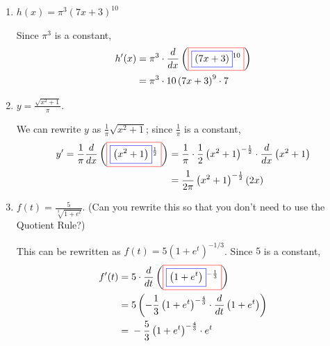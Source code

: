 \documentclass{article}
\begin{document}
\begin{enumerate}
\begin{enumerate}
  \item
    \begin{problem}[\vfill\newpage]
      $h(x) = \pi^3 (7x + 3)^{10}$
    \end{problem}

    \begin{solution}
      Since $\pi^3$ is a constant,
      \begin{align*}
        h'(x) = {} & \pi ^3\cdot \frac{d}{dx} \left(\fcolorbox{red}{white}{$\displaystyle \fcolorbox{blue}{white}{$\displaystyle  \left(7 x+ 3\right)$}^ { 10} $}\right) \\
        = {} & \pi ^3\cdot 10 \left(7 x+ 3\right)^ { 9} \cdot 7
      \end{align*}
    \end{solution}

  \item
    \begin{problem}[\stretch{0.5}]
      $y = \displaystyle \frac{\sqrt{x^2 + 1}}{\pi}$.
    \end{problem}

    \begin{solution}
      We can rewrite $y$ as $\frac{1}{\pi} \sqrt{x^2 + 1}$; since
      $\frac{1}{\pi}$ is a constant,
      \begin{align*}
        y' = {} \frac{1}{\pi} \frac{d}{dx}
        \left(\fcolorbox{red}{white}{$\displaystyle
            \fcolorbox{blue}{white}{$\displaystyle  \left(x^2 + 1
              \right)$}^ { \frac{1}{2}} $}\right) = {} & \frac{1}{\pi} \cdot
        \frac{1}{2}
        \left(x^2 + 1 \right)^ { -\frac{1}{2}} \cdot
        \frac{d}{dx}\left(x^2 + 1 \right) \\ 
        = {} & \frac{1}{2\pi} \left(x^2 + 1 \right)^ { -\frac{1}{2}}
        \left(2x \right) 
      \end{align*}
    \end{solution}

  \item
    \begin{problem}[\vfill]
      $f(t) = \displaystyle \frac{5}{\sqrt[3]{1 + e^t}}$.  (Can you
      rewrite this so that you don't need to use the Quotient Rule?)
    \end{problem}

    \begin{solution}
      This can be rewritten as $f(t) = 5 (1 + e^t)^{-1/3}$.  Since $5$ is
      a constant, 
      \begin{align*}
        f'(t) = {} & 5\cdot \frac{d}{dt} \left(\fcolorbox{red}{white}{$\displaystyle \fcolorbox{blue}{white}{$\displaystyle  \left(1+ e^ { t} \right)$}^ { -\frac{1}{3}} $}\right) \\
        = {} & 5 \left(-\frac{1}{3} \left(1+ e^ { t} \right)^ { -\frac{4}{3}} \cdot \frac{d}{dt}\left(1+ e^ { t} \right)\right) \\
        = {} & -\frac{5}{3} \left(1+ e^ { t} \right)^ { -\frac{4}{3}}
        \cdot e^ { t} 
      \end{align*}
    \end{solution}


\end{enumerate}
\end{enumerate}
\end{document}

